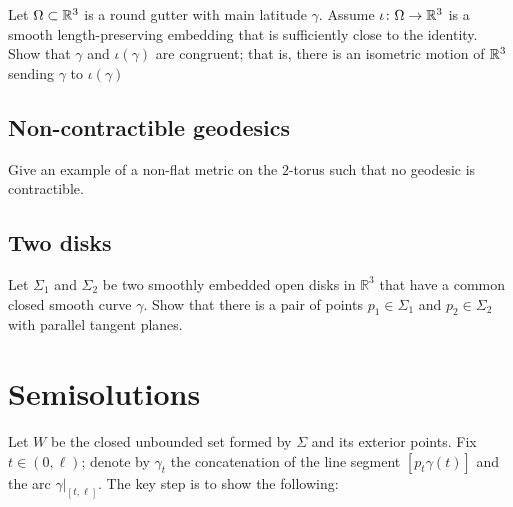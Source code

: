 \begin{pr}
Let $\Omega\subset \mathbb{R}^3$ is a round gutter with main latitude $\gamma$. 
Assume $\iota\:\Omega\z\to\RR^3$ 
is a smooth length-preserving embedding that is sufficiently close to the identity.
Show that $\gamma$ and $\iota(\gamma)$ are congruent;
that is, there is an isometric motion of $\mathbb{R}^3$ sending $\gamma$ to $\iota(\gamma)$
\end{pr}



\subsection*{Non-contractible geodesics}
\label{torus}

\begin{pr}
Give an example of a non-flat metric 
on the $2$-torus such that no geodesic is contractible.
\end{pr}


\subsection*{Two disks}
\label{Two disks}

\begin{pr}
Let $\Sigma_1$ and $\Sigma_2$ be two smoothly embedded open disks in $\mathbb R^3$ 
that have a common closed smooth curve $\gamma$.
Show that there is a pair of points  $p_1\in \Sigma_1$ and $p_2\in \Sigma_2$ with parallel tangent planes.
\end{pr}



\section*{Semisolutions}
Let $W$ be the closed unbounded set formed by $\Sigma$ and its exterior points.
Fix $t\in (0,\ell)$;
denote by $\gamma_t$ the concatenation of the line segment $[p_t\gamma(t)]$ and the arc $\gamma|_{[t,\ell]}$.
The key step is to show the following:

